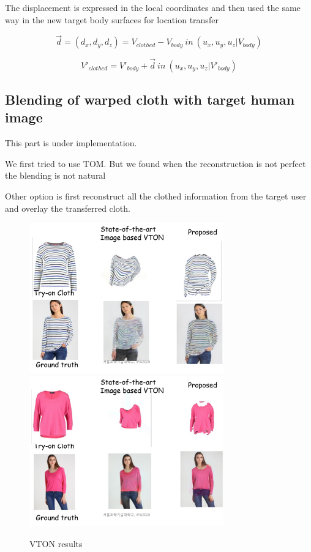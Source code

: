 \documentclass[runningheads]{llncs}
\begin{document}
The displacement is expressed in the local coordinates and then used the same way in the new target body surfaces for location transfer

\begin{equation}
\overrightarrow{d} = (d_x, d_y, d_z) = V_{clothed} - V_{body} \: in \: (u_x, u_y, u_z | V_{body})
\end{equation}


\begin{equation}
 V'_{clothed} = V'_{body} + \overrightarrow{d} \: in \: (u_x, u_y, u_z | V'_{body})
\end{equation}



\subsection{Blending of warped cloth with target human image}


This part is under implementation.

We first tried to use TOM. But we found when the reconstruction is not perfect the blending is not natural 

Other option is first reconstruct all the clothed information from the target user and overlay the transferred cloth.


\begin{figure}
\centering
\includegraphics[height=6.5cm, scale=1]{figures/vton_result1.png} 
\includegraphics[height=6.5cm, scale=1]{figures/vton_result2.png} 
\caption{VTON results}
\label{fig:vtonresults}
\end{figure}
\end{document}
